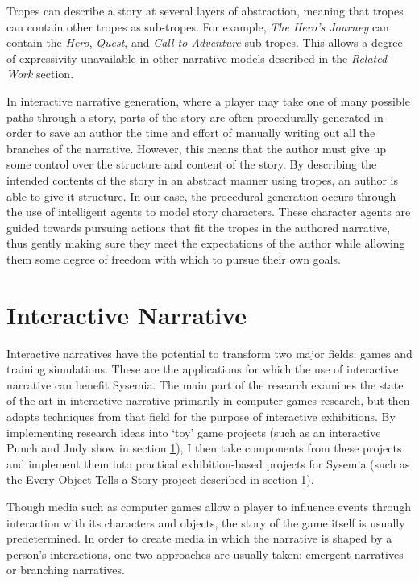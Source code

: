 Tropes can describe a story at several layers of abstraction, meaning that tropes can contain other tropes as sub-tropes. For example, \emph{The Hero's Journey} can contain the \emph{Hero}, \emph{Quest}, and \emph{Call to Adventure} sub-tropes. This allows a degree of expressivity unavailable in other narrative models described in the \emph{Related Work} section.

In interactive narrative generation, where a player may take one of many possible paths through a story, parts of the story are often procedurally generated in order to save an author the time and effort of manually writing out all the branches of the narrative. However, this means that the author must give up some control over the structure and content of the story. By describing the intended contents of the story in an abstract manner using tropes, an author is able to give it structure. In our case, the procedural generation occurs through the use of intelligent agents to model story characters. These character agents are guided towards pursuing actions that fit the tropes in the authored narrative, thus gently making sure they meet the expectations of the author while allowing them some degree of freedom with which to pursue their own goals.

\section{Interactive Narrative}
Interactive narratives have the potential to transform two major fields: games
and training simulations. These are the applications for which the use of
interactive narrative can benefit Sysemia. The main part of the research examines the state of the art in interactive narrative primarily in computer games research, but then adapts techniques from that field for the purpose of interactive exhibitions. By implementing research ideas into `toy' game projects (such as an interactive Punch and Judy show in section \ref{}), I then take components from these projects and implement them into practical exhibition-based projects for Sysemia (such as the Every Object Tells a Story project described in section \ref{}).

Though media such as computer games allow a player to influence events through interaction with its characters and objects, the story of the game itself is usually predetermined. In order to create media in which the narrative is shaped by a person's interactions, one two approaches are usually taken: emergent narratives or branching narratives.

